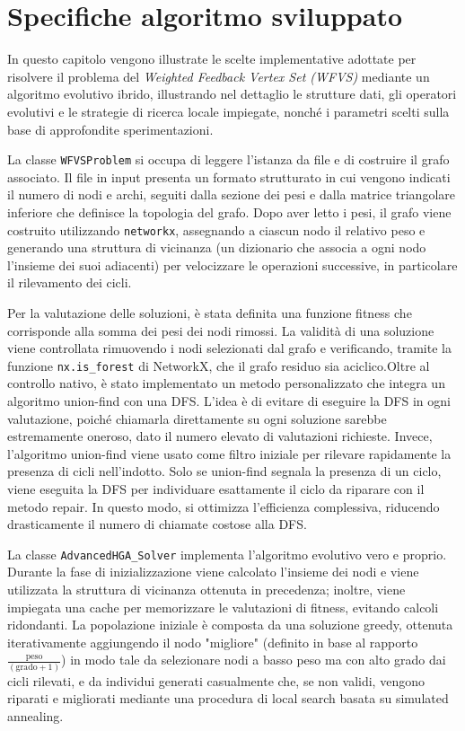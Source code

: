\documentclass[12pt,a4paper,twoside]{article}
\begin{document}
\section{Specifiche algoritmo sviluppato}
In questo capitolo vengono illustrate le scelte implementative adottate per risolvere il problema del \emph{Weighted Feedback Vertex Set (WFVS)} mediante un algoritmo evolutivo ibrido, illustrando nel dettaglio le strutture dati, gli operatori evolutivi e le strategie di ricerca locale impiegate, nonché i parametri scelti sulla base di approfondite sperimentazioni.

La classe \texttt{WFVSProblem} si occupa di leggere l'istanza da file e di costruire il grafo associato. Il file in input presenta un formato strutturato in cui vengono indicati il numero di nodi e archi, seguiti dalla sezione dei pesi e dalla matrice triangolare inferiore che definisce la topologia del grafo. Dopo aver letto i pesi, il grafo viene costruito utilizzando \texttt{networkx}, assegnando a ciascun nodo il relativo peso e generando una struttura di vicinanza (un dizionario che associa a ogni nodo l'insieme dei suoi adiacenti) per velocizzare le operazioni successive, in particolare il rilevamento dei cicli.

Per la valutazione delle soluzioni, è stata definita una funzione fitness che corrisponde alla somma dei pesi dei nodi rimossi. La validità di una soluzione viene controllata rimuovendo i nodi selezionati dal grafo e verificando, tramite la funzione \texttt{nx.is\_forest} di NetworkX, che il grafo residuo sia aciclico.Oltre al controllo nativo, è stato implementato un metodo personalizzato che integra un algoritmo union-find con una DFS. L'idea è di evitare di eseguire la DFS in ogni valutazione, poiché chiamarla direttamente su ogni soluzione sarebbe estremamente oneroso, dato il numero elevato di valutazioni richieste. Invece, l'algoritmo union-find viene usato come filtro iniziale per rilevare rapidamente la presenza di cicli nell'indotto. Solo se union-find segnala la presenza di un ciclo, viene eseguita la DFS per individuare esattamente il ciclo da riparare con il metodo repair. In questo modo, si ottimizza l'efficienza complessiva, riducendo drasticamente il numero di chiamate costose alla DFS.

La classe \texttt{AdvancedHGA\_Solver} implementa l'algoritmo evolutivo vero e proprio. Durante la fase di inizializzazione viene calcolato l'insieme dei nodi e viene utilizzata la struttura di vicinanza ottenuta in precedenza; inoltre, viene impiegata una cache per memorizzare le valutazioni di fitness, evitando calcoli ridondanti. La popolazione iniziale è composta da una soluzione greedy, ottenuta iterativamente aggiungendo il nodo "migliore" (definito in base al rapporto \(\frac{\text{peso}}{(\text{grado}+1)}\)) in modo tale da selezionare nodi a basso peso ma con alto grado dai cicli rilevati, e da individui generati casualmente che, se non validi, vengono riparati e migliorati mediante una procedura di local search basata su simulated annealing.
\end{document}
